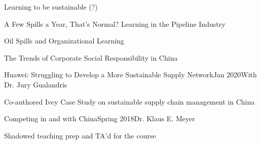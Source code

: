 \documentclass{gradstudentresume}
\begin{document}
	\begin{pres}{Learning to be sustainable (?)}
		\item {}
	\end{pres}

	\begin{pres}{A Few Spills a Year, That's Normal? Learning in the Pipeline Industry}
		\item {}
	\end{pres}

	\begin{pres}{Oil Spills and Organizational Learning}
		\item {}
	\end{pres}

	\begin{pres}{The Trends of Corporate Social Responsibility in China}
		\item {}
	\end{pres}


	\largespace

	\begin{desc}{Huawei: Struggling to Develop a More Sustainable Supply Network}{Jan 2020}{With Dr. Jury Gualandris}
		\item Co-authored Ivey Case Study on sustainable supply chain management in China
	\end{desc}

	\begin{desc}{Competing in and with China}{Spring 2018}{Dr. Klaus E. Meyer}
		\item Shadowed teaching prep and TA'd for the course
	\end{desc}
\end{document}

